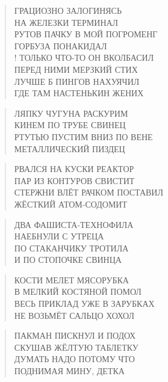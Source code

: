 \poemtitle{***}
\begin{verse}
ГРАЦИОЗНО ЗАЛОГИНЯСЬ \\
НА ЖЕЛЕЗКИ ТЕРМИНАЛ\\
РУТОВ ПАЧКУ В МОЙ ПОГРОМЕНГ\\
ГОРБУЗА ПОНАКИДАЛ\\!
ТОЛЬКО ЧТО-ТО ОН ВКОЛБАСИЛ\\
ПЕРЕД НИМИ МЕРЗКИЙ СТИХ\\
ЛУЧШЕ Б ПИНГОВ НАХУЯЧИЛ\\
ГДЕ ТАМ НАСТЕНЬКИН ЖЕНИХ
\end{verse}

\poemtitle{***}
\begin{verse}
ЛЯПКУ ЧУГУНА РАСКУРИМ\\
КИНЕМ ПО ТРУБЕ СВИНЕЦ\\
РТУТЬЮ ПУСТИМ ВНИЗ ПО ВЕНЕ\\
МЕТАЛЛИЧЕСКИЙ ПИЗДЕЦ
\end{verse}

\poemtitle{***}
\begin{verse}
РВАЛСЯ НА КУСКИ РЕАКТОР\\
ПАР ИЗ КОНТУРОВ СВИСТИТ\\
СТЕРЖНИ ВЛЁТ РАЧКОМ ПОСТАВИЛ\\
ЖЁСТКИЙ АТОМ-СОДОМИТ
\end{verse}

\poemtitle{***}
\begin{verse}
ДВА ФАШИСТА-ТЕХНОФИЛА\\
НАЕБНУЛИ С УТРЕЦА\\
ПО СТАКАНЧИКУ ТРОТИЛА\\
И ПО СТОПОЧКЕ СВИНЦА
\end{verse}

\poemtitle{***}
\begin{verse}
КОСТИ МЕЛЕТ МЯСОРУБКА\\
В МЕЛКИЙ КОСТЯНОЙ ПОМОЛ\\
ВЕСЬ ПРИКЛАД УЖЕ В ЗАРУБКАХ\\
НЕ ВОЗЬМЁТ САЛЬЦО ХОХОЛ
\end{verse}

\poemtitle{***}
\begin{verse}
ПАКМАН ПИСКНУЛ И ПОДОХ\\
СКУШАВ ЖЁЛТУЮ ТАБЛЕТКУ\\
ДУМАТЬ НАДО ПОТОМУ ЧТО\\
ПОДНИМАЯ МИНУ, ДЕТКА
\end{verse}

